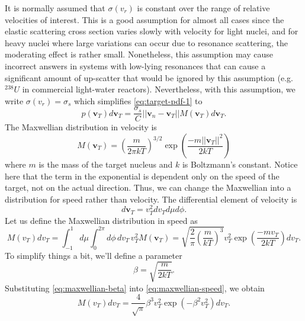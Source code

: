 It is normally assumed that $\sigma (v_r)$ is constant over the range of
relative velocities of interest. This is a good assumption for almost all cases
since the elastic scattering cross section varies slowly with velocity for light
nuclei, and for heavy nuclei where large variations can occur due to resonance
scattering, the moderating effect is rather small. Nonetheless, this assumption
may cause incorrect answers in systems with low-lying resonances that can cause
a significant amount of up-scatter that would be ignored by this assumption
(e.g. $^{238}U$ in commercial light-water reactors). Nevertheless, with this
assumption, we write $\sigma (v_r) = \sigma_s$ which simplifies
\eqref{eq:target-pdf-1} to
\begin{equation}
  \label{eq:target-pdf-2}
  p( \mathbf{v}_T ) d\mathbf{v}_T = \frac{\sigma_s}{C} || \mathbf{v}_n -
  \mathbf{v}_T || M ( \mathbf{v}_T ) d\mathbf{v}_T.
\end{equation}
The Maxwellian distribution in velocity is
\begin{equation}
  \label{eq:maxwellian-velocity}
  M (\mathbf{v}_T) = \left ( \frac{m}{2\pi kT} \right )^{3/2} \exp \left (
  \frac{-m || \mathbf{v}_T ||^2}{2kT} \right )
\end{equation}
where $m$ is the mass of the target nucleus and $k$ is Boltzmann's
constant. Notice here that the term in the exponential is dependent only on the
speed of the target, not on the actual direction. Thus, we can change the
Maxwellian into a distribution for speed rather than velocity. The differential
element of velocity is
\begin{equation}
  \label{eq:differential-velocity}
  d\mathbf{v}_T = v_T^2 dv_T d\mu d\phi.
\end{equation}
Let us define the Maxwellian distribution in speed as
\begin{equation}
  \label{eq:maxwellian-speed}
  M (v_T) dv_T = \int_{-1}^1 d\mu \int_{0}^{2\pi} d\phi \, dv_T \, v_T^2
  M(\mathbf{v}_T) = \sqrt{ \frac{2}{\pi} \left ( \frac{m}{kT} \right )^3}
  v_T^2 \exp \left ( \frac{-m v_T}{2kT} \right ) dv_T.
\end{equation}
To simplify things a bit, we'll define a parameter
\begin{equation}
  \label{eq:maxwellian-beta}
  \beta = \sqrt{\frac{m}{2kT}}.
\end{equation}
Substituting \eqref{eq:maxwellian-beta} into \eqref{eq:maxwellian-speed}, we
obtain
\begin{equation}
  \label{eq:maxwellian-speed2}
  M (v_T) dv_T = \frac{4}{\sqrt{\pi}} \beta^3 v_T^2 \exp \left ( -\beta^2
  v_T^2 \right ) dv_T.
\end{equation}
